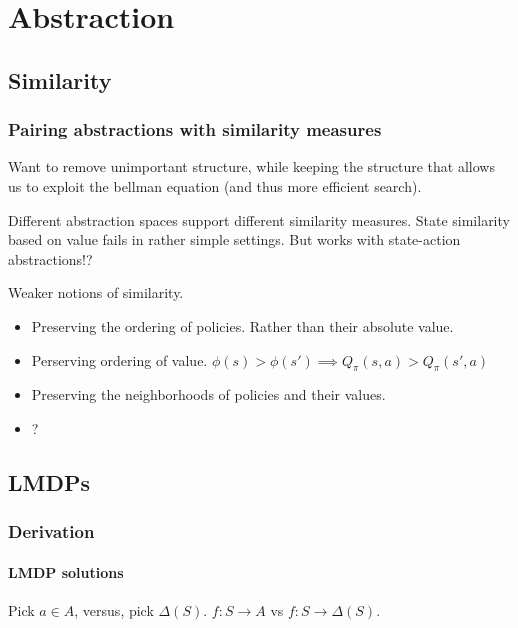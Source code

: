 \chapter{Abstraction}

\section{Similarity}

\subsection{Pairing abstractions with similarity measures}


Want to remove unimportant structure, while keeping the structure that allows us
to exploit the bellman equation (and thus more efficient search).

Different abstraction spaces support different similarity measures.
State similarity based on value fails in rather simple settings.
But works with state-action abstractions!?

Weaker notions of similarity.
\begin{itemize}
\tightlist
  \item Preserving the ordering of policies. Rather than their absolute value.
  \item Perserving ordering of value. $\phi(s) > \phi(s') \implies Q_{\pi}(s, a) > Q_{\pi}(s', a)$
  \item Preserving the neighborhoods of policies and their values.
  \item ?
\end{itemize}


\section{LMDPs}

\subsection{Derivation}

\subsubsection{LMDP solutions}

Pick $a \in A$, versus, pick $\Delta(S)$. $f: S\to A$ vs $f:S \to \Delta(S)$.

